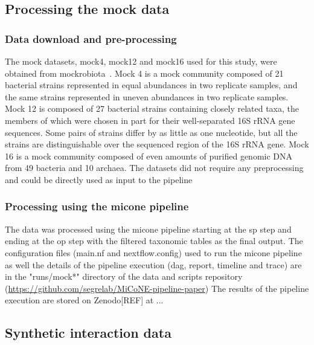   \subsection*{Processing the mock data}

    \subsubsection*{Data download and pre-processing}
    The mock datasets, mock4, mock12 and mock16 used for this study, were obtained from mockrobiota~\cite{Bokulich2016}.
    Mock 4 is a mock community composed of 21 bacterial strains represented in equal abundances in two replicate samples, and the same strains represented in uneven abundances in two replicate samples.
    Mock 12 is composed of 27 bacterial strains containing closely related taxa, the members of which were chosen in part for their well-separated 16S rRNA gene sequences. Some pairs of strains differ by as little as one nucleotide, but all the strains are distinguishable over the sequenced region of the 16S rRNA gene.
    Mock 16 is a mock community composed of even amounts of purified genomic DNA from 49 bacteria and 10 archaea.
    The datasets did not require any preprocessing and could be directly used as input to the pipeline

    \subsubsection*{Processing using the \ac{micone} pipeline}
    The data was processed using the \ac{micone} pipeline starting at the \ac{sp} step and ending at the \ac{op} step with the filtered taxonomic tables as the final output.
    The configuration files (main.nf and nextflow.config) used to run the \ac{micone} pipeline as well the details of the pipeline execution (dag, report, timeline and trace) are in the "runs/mock*" directory of the data and scripts repository (\href{https://github.com/segrelab/MiCoNE-pipeline-paper}{https://github.com/segrelab/MiCoNE-pipeline-paper})
    The results of the pipeline execution are stored on Zenodo[REF] at ...

  \subsection*{Synthetic interaction data}

